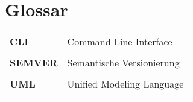 %
%
%
\chapter{Glossar}
\label{cha:glossar}


\begin{tabular}{p{3cm} p{12cm}}

\textbf{CLI} & Command Line Interface\\
\\
\textbf{SEMVER} & Semantische Versionierung \\
\\
\textbf{UML} & Unified Modeling Language \\
\\
\end{tabular}
